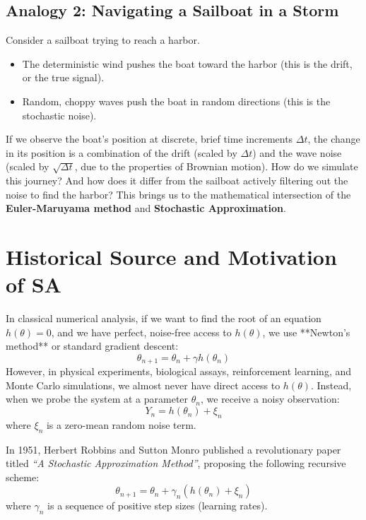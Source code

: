 \documentclass[11pt]{article}
\begin{document}
\subsection{Analogy 2: Navigating a Sailboat in a Storm}
Consider a sailboat trying to reach a harbor. 
\begin{itemize}
    \item The deterministic wind pushes the boat toward the harbor (this is the drift, or the true signal).
    \item Random, choppy waves push the boat in random directions (this is the stochastic noise).
\end{itemize}
If we observe the boat's position at discrete, brief time increments $\Delta t$, the change in its position is a combination of the drift (scaled by $\Delta t$) and the wave noise (scaled by $\sqrt{\Delta t}$, due to the properties of Brownian motion). How do we simulate this journey? And how does it differ from the sailboat actively filtering out the noise to find the harbor? This brings us to the mathematical intersection of the \textbf{Euler-Maruyama method} and \textbf{Stochastic Approximation}.

\section{Historical Source and Motivation of SA}

In classical numerical analysis, if we want to find the root of an equation $h(\theta) = 0$, and we have perfect, noise-free access to $h(\theta)$, we use **Newton's method** or standard gradient descent:
\begin{equation}
    \theta_{n+1} = \theta_n + \gamma h(\theta_n)
\end{equation}
However, in physical experiments, biological assays, reinforcement learning, and Monte Carlo simulations, we almost never have direct access to $h(\theta)$. Instead, when we probe the system at a parameter $\theta_n$, we receive a noisy observation:
\begin{equation}
    Y_n = h(\theta_n) + \xi_n
\end{equation}
where $\xi_n$ is a zero-mean random noise term. 

In 1951, Herbert Robbins and Sutton Monro published a revolutionary paper titled \textit{``A Stochastic Approximation Method''}, proposing the following recursive scheme:
\begin{equation}
    \theta_{n+1} = \theta_n + \gamma_n (h(\theta_n) + \xi_n)
\end{equation}
where $\gamma_n$ is a sequence of positive step sizes (learning rates).
\end{document}
